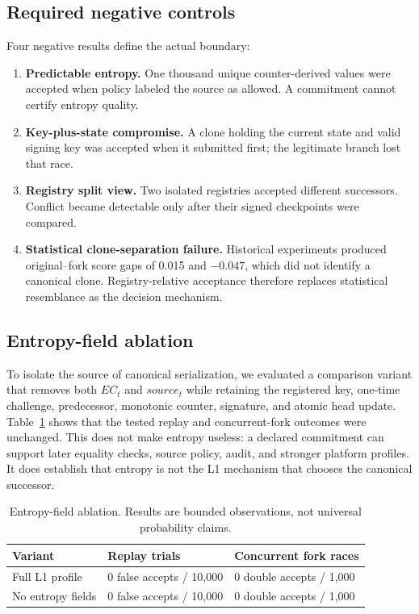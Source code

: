 \documentclass[11pt]{article}
\begin{document}
\subsection{Required negative controls}
Four negative results define the actual boundary:
\begin{enumerate}
  \item \textbf{Predictable entropy.} One thousand unique counter-derived values were accepted when policy labeled the source as allowed. A commitment cannot certify entropy quality.
  \item \textbf{Key-plus-state compromise.} A clone holding the current state and valid signing key was accepted when it submitted first; the legitimate branch lost that race.
  \item \textbf{Registry split view.} Two isolated registries accepted different successors. Conflict became detectable only after their signed checkpoints were compared.
  \item \textbf{Statistical clone-separation failure.} Historical experiments produced original--fork score gaps of 0.015 and $-0.047$, which did not identify a canonical clone. Registry-relative acceptance therefore replaces statistical resemblance as the decision mechanism.
\end{enumerate}

\subsection{Entropy-field ablation}
To isolate the source of canonical serialization, we evaluated a comparison variant that removes both $EC_t$ and $source_t$ while retaining the registered key, one-time challenge, predecessor, monotonic counter, signature, and atomic head update. Table~\ref{tab:ablation} shows that the tested replay and concurrent-fork outcomes were unchanged. This does not make entropy useless: a declared commitment can support later equality checks, source policy, audit, and stronger platform profiles. It does establish that entropy is not the L1 mechanism that chooses the canonical successor.

\begin{table}[t]
\centering
\caption{Entropy-field ablation. Results are bounded observations, not universal probability claims.}
\label{tab:ablation}
\small
\begin{tabular}{p{}p{}p{}}
\toprule
Variant & Replay trials & Concurrent fork races\\
\midrule
Full L1 profile & 0 false accepts / 10,000 & 0 double accepts / 1,000\\
No entropy fields & 0 false accepts / 10,000 & 0 double accepts / 1,000\\
\bottomrule
\end{tabular}
\end{table}
\end{document}

